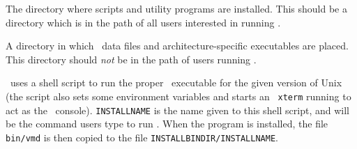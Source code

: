 
%
%
%
\begin{itemize}
The directory where scripts
and utility programs are installed.  This should be a directory which
is in the path of all users interested in running \VMD.

A directory in which \VMD\ data
files and architecture-specific executables are placed.  This
directory should {\em not} be in the path of users running \VMD.

\VMD\ uses a shell script to run the proper \VMD\ executable for the given version of Unix (the
script also sets some environment variables and starts an {\tt
xterm} running to act as the \VMD\ console).  {\tt INSTALLNAME}
is the name given to this shell script, and will be the command users
type to run \VMD.  When the program is
installed, the file {\tt bin/vmd} is then copied to the file
{\tt INSTALLBINDIR/INSTALLNAME}.

\end{itemize}



